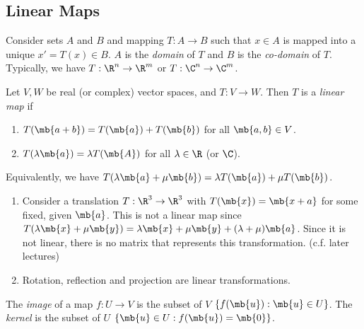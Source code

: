 \documentclass[a4paper]{article}
\begin{document}
\subsection{Linear Maps}
\begin{defi}
  Consider sets $A$ and $B$ and mapping $T:A\to B$ such that $x\in A$ is mapped into a unique $x' = T(x)\in B$. $A$ is the \emph{domain} of $T$ and $B$ is the \emph{co-domain} of $T$. Typically, we have $T:\R^n \to \R^m$ or $T:\C^n\to \C^m$.
\end{defi}

\begin{defi}
  Let $V, W$ be real (or complex) vector spaces, and $T: V\to W$. Then $T$ is a \emph{linear map} if
  \begin{enumerate}
    \item $T(\mb{a + b}) = T(\mb{a}) + T(\mb{b})$ for all $\mb{a, b}\in V$.
    \item $T(\lambda\mb{a}) = \lambda T(\mb{A})$ for all $\lambda \in \R$ (or $\C$).
  \end{enumerate}
  Equivalently, we have $T(\lambda\mb{a} + \mu\mb{b}) = \lambda T(\mb{a}) + \mu T(\mb{b})$.
\end{defi}

\begin{eg}\leavevmode
  \begin{enumerate}
  \item Consider a translation $T:\R^3 \to \R^3$ with $T(\mb{x}) = \mb{x + a}$ for some fixed, given $\mb{a}$. This is not a linear map since $T(\lambda\mb{x} + \mu\mb{y}) = \lambda \mb{x} + \mu \mb{y} + (\lambda + \mu)\mb{a}$. Since it is not linear, there is no matrix that represents this transformation. (c.f. later lectures)
  \item Rotation, reflection and projection are linear transformations.
  \end{enumerate}
\end{eg}

\begin{defi}
  The \emph{image} of a map $f: U\to V$ is the subset of $V$ $\{f(\mb{u}): \mb{u}\in U\}$. The \emph{kernel} is the subset of $U$ $\{\mb{u}\in U: f(\mb{u}) = \mb{0}\}$.
\end{defi}
\end{document}
